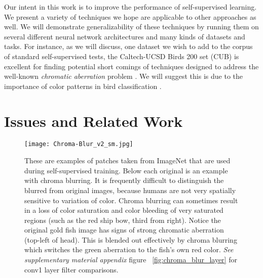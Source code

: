 \documentclass[10pt,twocolumn,letterpaper]{article}
\begin{document}
Our intent in this work is to improve the performance of self-supervised learning. We present a variety of techniques we hope are applicable to other approaches as well. We will demonstrate generalizability of these techniques by running them on several different neural network architectures and many kinds of datasets and tasks.  For instance, as we will discuss, one dataset we wish to add to the corpus of standard self-supervised tests, the Caltech-UCSD Birds 200 set (CUB) \cite{Welinder10} is excellent for finding potential short comings of techniques designed to address the well-known \emph{chromatic aberration} problem \cite{Doersch15}. We will suggest this is due to the importance of color patterns in bird classification \cite{Cornell09}.  


\section{Issues and Related Work}
\begin{figure*}
\centering
\texttt{[image: Chroma-Blur\_v2\_sm.jpg]}
\caption{These are examples of patches taken from ImageNet that are used during self-supervised training. Below each original is an example with chroma blurring. It is frequently difficult to distinguish the blurred from original images, because humans are not very spatially sensitive to variation of color. Chroma blurring can sometimes result in a loss of color saturation and color bleeding of very saturated regions (such as the red ship bow, third from right). Notice the original gold fish image has signs of strong chromatic aberration (top-left of head). This is blended out effectively by chroma blurring which switches the green aberration to the fish's own red color. \emph{See supplementary material appendix} figure ~\ref{fig:chroma_blur_layer} for conv1 layer filter comparisons. }
\label{fig:chroma_blur}
\end{figure*}
\end{document}
